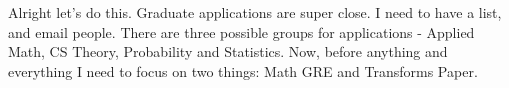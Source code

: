 \noindent {}

Alright let's do this. Graduate applications are super close. I need to have a list, and email people. There are three possible groups for applications - Applied Math, CS Theory, Probability and Statistics.  Now, before anything and everything I need to focus on two things: Math GRE and Transforms Paper.